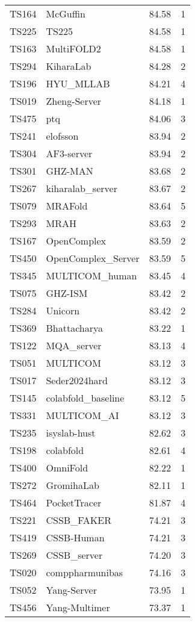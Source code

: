 \begin{table}[ht]
{\begin{tabular}{llrr}
TS164 & McGuffin & 84.58 & 1 \\ 
TS225 & TS225 & 84.58 & 1 \\ 
TS163 & MultiFOLD2 & 84.58 & 1 \\ 
TS294 & KiharaLab & 84.28 & 2 \\ 
TS196 & HYU\_MLLAB & 84.21 & 4 \\ 
TS019 & Zheng-Server & 84.18 & 1 \\ 
TS475 & ptq & 84.06 & 3 \\ 
TS241 & elofsson & 83.94 & 2 \\ 
TS304 & AF3-server & 83.94 & 2 \\ 
TS301 & GHZ-MAN & 83.68 & 2 \\ 
TS267 & kiharalab\_server & 83.67 & 2 \\ 
TS079 & MRAFold & 83.64 & 5 \\ 
TS293 & MRAH & 83.63 & 2 \\ 
TS167 & OpenComplex & 83.59 & 2 \\ 
TS450 & OpenComplex\_Server & 83.59 & 5 \\ 
TS345 & MULTICOM\_human & 83.45 & 4 \\ 
TS075 & GHZ-ISM & 83.42 & 2 \\ 
TS284 & Unicorn & 83.42 & 2 \\ 
TS369 & Bhattacharya & 83.22 & 1 \\ 
TS122 & MQA\_server & 83.13 & 4 \\ 
TS051 & MULTICOM & 83.12 & 3 \\ 
TS017 & Seder2024hard & 83.12 & 3 \\ 
TS145 & colabfold\_baseline & 83.12 & 5 \\ 
TS331 & MULTICOM\_AI & 83.12 & 3 \\ 
TS235 & isyslab-hust & 82.62 & 3 \\ 
TS198 & colabfold & 82.61 & 4 \\ 
TS400 & OmniFold & 82.22 & 1 \\ 
TS272 & GromihaLab & 82.11 & 1 \\ 
TS464 & PocketTracer & 81.87 & 4 \\ 
TS221 & CSSB\_FAKER & 74.21 & 3 \\ 
TS419 & CSSB-Human & 74.21 & 3 \\ 
TS269 & CSSB\_server & 74.20 & 3 \\ 
TS020 & comppharmunibas & 74.16 & 3 \\ 
TS052 & Yang-Server & 73.95 & 1 \\ 
TS456 & Yang-Multimer & 73.37 & 1 \\ 

\end{tabular}}
\end{table}

